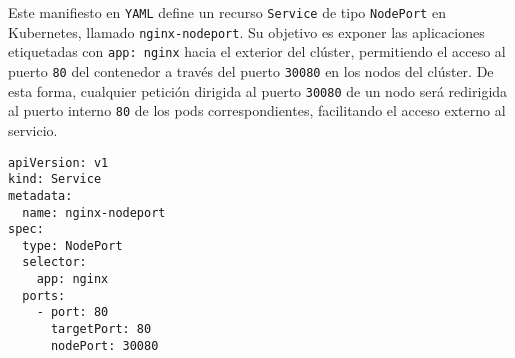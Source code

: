 Este manifiesto en \texttt{YAML} define un recurso \texttt{Service} de tipo \texttt{NodePort} en Kubernetes, llamado \texttt{nginx-nodeport}. Su objetivo es exponer las aplicaciones etiquetadas con \texttt{app: nginx} hacia el exterior del clúster, permitiendo el acceso al puerto \texttt{80} del contenedor a través del puerto \texttt{30080} en los nodos del clúster. De esta forma, cualquier petición dirigida al puerto \texttt{30080} de un nodo será redirigida al puerto interno \texttt{80} de los pods correspondientes, facilitando el acceso externo al servicio.

\begin{verbatim}
apiVersion: v1
kind: Service
metadata:
  name: nginx-nodeport
spec:
  type: NodePort
  selector:
    app: nginx
  ports:
    - port: 80            
      targetPort: 80      
      nodePort: 30080     
\end{verbatim}